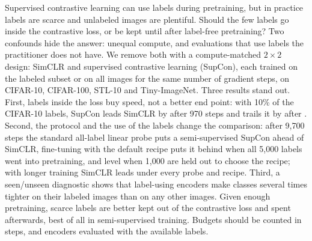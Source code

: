 Supervised contrastive learning can use labels during pretraining, but in practice labels are scarce and
unlabeled images are plentiful. Should the few labels go inside the contrastive loss, or be kept until
after label-free pretraining? Two confounds hide the answer: unequal compute, and evaluations that use labels
the practitioner does not have. We remove both with a compute-matched $2\times2$ design: SimCLR and supervised
contrastive learning (SupCon), each trained on the labeled subset or on all images for the same number of
gradient steps, on CIFAR-10, CIFAR-100, STL-10 and Tiny-ImageNet. Three results stand out. First, labels inside
the loss buy speed, not a better end point: with 10\% of the CIFAR-10 labels, SupCon leads SimCLR by
\pt after 970 steps and trails it by \pt after
. Second, the protocol and the use of the labels change the comparison: after 9,700 steps the
standard all-label linear probe puts a semi-supervised SupCon \pt
ahead of SimCLR, fine-tuning with the default recipe puts it \pt behind when all 5,000 labels went into
pretraining, and level when 1,000 are held out to choose the recipe; with longer training SimCLR leads under every
probe and recipe. Third, a seen/unseen
diagnostic shows that label-using encoders make classes several times tighter on their labeled images than on any
other images. Given enough pretraining, scarce labels are better kept out of the contrastive loss and spent
afterwards, best of all in semi-supervised training. Budgets should be counted in steps, and encoders evaluated with the available
labels.
